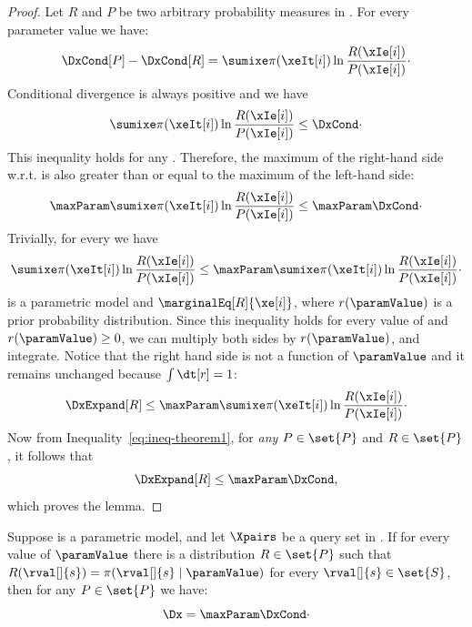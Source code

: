 \begin{proof}
    \newcommand{\RP}{\sumixe \pi(\xeIt[i]) \ln \frac{R(\xIe[i])}{P(\xIe[i])}}

    Let $R$ and $P$ be two arbitrary probability measures in \Mt.
    For every parameter value \paramValue we have:
    \[
        \DxCond[P] - \DxCond[R] = \RP \cdot
    \]
    Conditional divergence is always positive and we have
    \[
        \RP \leq \DxCond \cdot
    \]
    This inequality holds for any \paramValue.
    Therefore, the maximum of the right-hand side w.r.t. \paramValue is also greater than or equal to the
    maximum of the left-hand side:
    \begin{equation}
        \maxParam \RP \leq \maxParam \DxCond \cdot
        \label{eq:ineq-theorem1}
    \end{equation}
    Trivially, for every \paramValue we have
    \[
        \RP \leq \maxParam \RP \cdot
    \]
    \Mt is a parametric model and $\marginalEq[R]{\xe[i]}$, where $r(\paramValue)$ is
    a prior probability distribution.
    Since this inequality holds for every value of \paramValue and $r(\paramValue) \geq 0$, we can multiply both
    sides by $r(\paramValue)$, and integrate.
    Notice that the right hand side is not a function of $\paramValue$ and it remains unchanged
    because $\int \dt[r] = 1$:
    \[
        \DxExpand[R] \leq \maxParam \RP\cdot
    \]
    Now from Inequality~\ref{eq:ineq-theorem1}, for \emph{any} $P \in \set{P}$ and $R \in \set{P}$, it
    follows that
    \[
        \DxExpand[R] \leq \maxParam \DxCond,
    \]
    which proves the lemma.
\end{proof}

\begin{theorem}
    \label{th:Dx_parametric_form}
    Suppose \pmodel is a parametric model, and let $\Xpairs$ be a query set in \Mt.
    If for every value of $\paramValue$ there is a distribution $R \in \set{P}$ such that
    $R(\rval[]{s}) = \pi(\rval[]{s} \mid \paramValue)$ for every $\rval[]{s} \in \set{S}$,
    then for any $P \in \set{P}$ we have:
    \begin{equation}
        \Dx = \maxParam \DxCond  \cdot
        \label{eq:div_parametric}
    \end{equation}
    \label{th:div_for_parametric}
\end{theorem}

